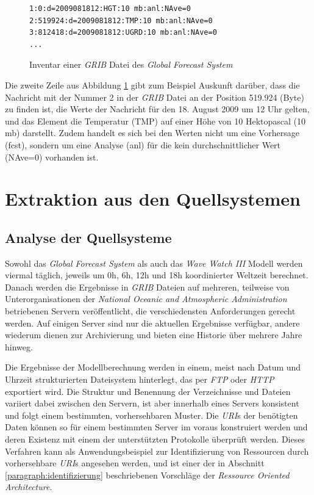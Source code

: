 \begin{figure}[h]
\begin{Verbatim}[frame=lines,framerule=0.5pt,framesep=3mm]
1:0:d=2009081812:HGT:10 mb:anl:NAve=0
2:519924:d=2009081812:TMP:10 mb:anl:NAve=0
3:812418:d=2009081812:UGRD:10 mb:anl:NAve=0
...
\end{Verbatim}
  \caption{Inventar einer \textit{GRIB} Datei des \textit{Global
      Forecast System} }
  \label{abbildung:inventar}
\end{figure}

Die zweite Zeile aus Abbildung \ref{abbildung:inventar} gibt zum
Beispiel Auskunft darüber, dass die Nachricht mit der Nummer 2 in der
\textit{GRIB} Datei an der Position 519.924 (Byte) zu finden ist, die
Werte der Nachricht für den 18. August 2009 um 12 Uhr gelten, und das
Element die Temperatur (TMP) auf einer Höhe von 10 Hektopascal (10 mb)
darstellt. Zudem handelt es sich bei den Werten nicht um eine
Vorhersage (fcst), sondern um eine Analyse (anl) für die kein
durchschnittlicher Wert (NAve=0) vorhanden ist.

\section{Extraktion aus den Quellsystemen}

\subsection{Analyse der Quellsysteme}

Sowohl das \textit{Global Forecast System} als auch das \textit{Wave
  Watch III} Modell werden viermal täglich, jeweils um 0h, 6h, 12h und
18h koordinierter Weltzeit berechnet. Danach werden die Ergebnisse in
\textit{GRIB} Dateien auf mehreren, teilweise von Unterorganisationen
der \textit{National Oceanic and Atmospheric Administration}
betriebenen Servern veröffentlicht, die verschiedensten Anforderungen
gerecht werden. Auf einigen Server sind nur die aktuellen Ergebnisse
verfügbar, andere wiederum dienen zur Archivierung und bieten eine
Historie über mehrere Jahre hinweg.

Die Ergebnisse der Modellberechnung werden in einem, meist nach Datum
und Uhrzeit strukturierten Dateisystem hinterlegt, das per
\textit{FTP} oder \textit{HTTP} exportiert wird. Die Struktur und
Benennung der Verzeichnisse und Dateien variiert dabei zwischen den
Servern, ist aber innerhalb eines Servers konsistent und folgt einem
bestimmten, vorhersehbaren Muster. Die \textit{URI}s der benötigten
Daten können so für einem bestimmten Server im voraus konstruiert
werden und deren Existenz mit einem der unterstützten Protokolle
überprüft werden. Dieses Verfahren kann als Anwendungsbeispiel zur
Identifizierung von Ressourcen durch vorhersehbare \textit{URI}s
angesehen werden, und ist einer der in Abschnitt
\ref{paragraph:identifizierung} beschriebenen Vorschläge der
\textit{Ressource Oriented Architecture}.

